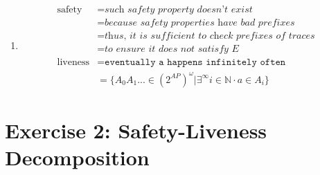 \documentclass{article}
\newcommand{\N}{\mathbb{N}}
\begin{document}
\begin{enumerate}[a]
    \item
    \begin{equation*}
        \begin{split}
            \text{safety} &= \textit{such safety property doesn't exist} \\
            &= \textit{because safety properties have bad prefixes} \\
            &= \textit{thus, it is sufficient to check prefixes of traces } \\
            &= \textit{to ensure it does not satisfy E} \\
            \text{liveness} &= \texttt{eventually a happens infinitely often}\\ 
            &= \{ A_0 A_1 ... \in (2^{AP})^\omega | \exists ^\infty i \in \N \cdot a \in A_i \}
        \end{split}
    \end{equation*}
\end{enumerate}

\newpage
\section*{Exercise 2: Safety-Liveness Decomposition}
\end{document}
